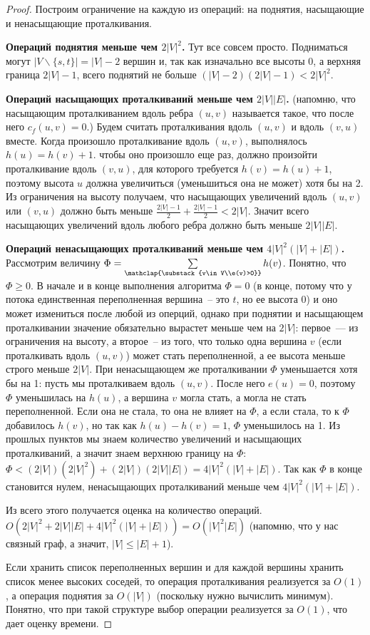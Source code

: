 \begin{proof}Построим ограничение на каждую из операций: на поднятия, насыщающие и ненасыщающие проталкивания.

{\bf Операций поднятия меньше чем $2|V|^2$.} Тут все совсем просто. Подниматься могут $|V\smallsetminus\{s,t\}|=|V|-2$ вершин и, так как изначально все высоты 0, а верхняя граница $2|V|-1$, всего поднятий не больше $(|V|-2)(2|V|-1)<2|V|^2$.

{\bf Операций насыщающих проталкиваний меньше чем $2|V||E|$.} (напомню, что насыщающим проталкиванием вдоль ребра $(u,v)$ называется такое, что после него $c_f(u,v)=0$.) Будем считать проталкивания вдоль $(u,v)$ и вдоль $(v,u)$ вместе. Когда произошло проталкивание вдоль $(u,v)$, выполнялось $h(u)=h(v)+1$. чтобы оно произошло еще раз, должно произойти проталкивание вдоль $(v,u)$, для которого требуется $h(v)=h(u)+1$, поэтому высота $u$ должна увеличиться (уменьшиться она не может) хотя бы на 2. Из ограничения на высоту получаем, что насыщающих увеличений вдоль $(u,v)$ или $(v,u)$ должно быть меньше $\frac{2|V|-1}{2}+\frac{2|V|-1}{2}<2|V|$. Значит всего насыщающих увеличений вдоль любого ребра должно быть меньше $2|V||E|$.

{\bf Операций ненасыщающих проталкиваний меньше чем $4|V|^2(|V|+|E|)$.} Рассмотрим величину $\Phi=\sum\limits_{\mathclap{\substack{v\in V\\e(v)>0}}}h(v)$. Понятно, что $\Phi\ge0$. В начале и в конце выполнения алгоритма $\Phi=0$ (в конце, потому что у потока единственная переполненная вершина~-- это $t$, но ее высота 0) и оно может измениться после любой из оперций, однако при поднятии и насыщающем проталкивании значение обязательно вырастет меньше чем на $2|V|$: первое~--- из ограничения на высоту, а второе~-- из того, что только одна вершина $v$ (если проталкивать вдоль $(u,v)$) может стать переполненной, а ее высота меньше строго меньше $2|V|$.
При ненасыщающем же проталкивании $\Phi$ уменьшается хотя бы на 1: пусть мы проталкиваем вдоль $(u,v)$. После него $e(u)=0$, поэтому $\Phi$ уменьшилась на $h(u)$, а вершина $v$ могла стать, а могла не стать переполненной. Если она не стала, то она не влияет на $\Phi$, а если стала, то к $\Phi$ добавилось $h(v)$, но так как $h(u)-h(v)=1$, $\Phi$ уменьшилось на 1.
Из прошлых пунктов мы знаем количество увеличений и насыщающих проталкиваний, а значит знаем верхнюю границу на $\Phi$: $\Phi<(2|V|)(2|V|^2)+(2|V|)(2|V||E|)=4|V|^2(|V|+|E|)$. Так как $\Phi$ в конце становится нулем, ненасыщающих проталкиваний меньше чем $4|V|^2(|V|+|E|)$.

Из всего этого получается оценка на количество операций. $O(2|V|^2+2|V||E|+4|V|^2(|V|+|E|))=O(|V|^2|E|)$ (напомню, что у нас связный граф, а значит, $|V|\le |E|+1$).

Если хранить список переполненных вершин и для каждой вершины хранить список менее высоких соседей, то операция проталкивания реализуется за $O(1)$, а операция поднятия за $O(|V|)$ (поскольку нужно вычислить минимум). Понятно, что при такой структуре выбор операции реализуется за $O(1)$, что дает оценку времени.
\end{proof}